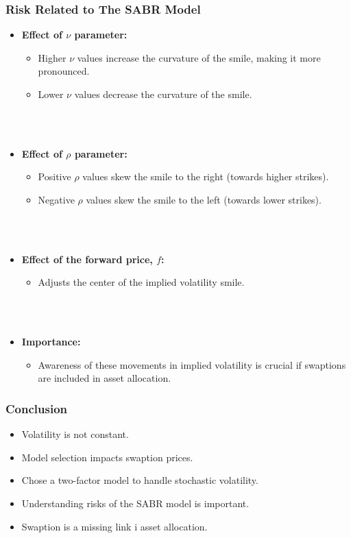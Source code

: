 \documentclass{beamer}
\begin{document}
\begin{frame}
    \frametitle{\textcolor{KUrod}{Risk Related to The SABR Model}}
    \begin{itemize}
    \\\\
        \item \textbf{Effect of $\nu$ parameter:}
        \begin{itemize}[label=\textcolor{KUrod}{\textbullet}]
            \item Higher $\nu$ values increase the curvature of the smile, making it more pronounced.
            \item Lower $\nu$ values decrease the curvature of the smile.
        \end{itemize}
    \\\\
        \item \textbf{Effect of $\rho$ parameter:}
        \begin{itemize}[label=\textcolor{KUrod}{\textbullet}]
            \item Positive $\rho$ values skew the smile to the right (towards higher strikes).
            \item Negative $\rho$ values skew the smile to the left (towards lower strikes).
        \end{itemize}
    \\\\
        \item \textbf{Effect of the forward price, $f$:}
        \begin{itemize}[label=\textcolor{KUrod}{\textbullet}]
            \item Adjusts the center of the implied volatility smile.
        \end{itemize}
    \\\\
        \item \textbf{Importance:}
        \begin{itemize}[label=\textcolor{KUrod}{\textbullet}]
            \item Awareness of these movements in implied volatility is crucial if swaptions are included in asset allocation.
        \end{itemize}
    \end{itemize} 
\end{frame}

\begin{frame}
    \frametitle{\textcolor{KUrod}{Conclusion}}
    \begin{itemize}[label=\textcolor{KUrod}{\textbullet}]
        \item Volatility is not constant.
        \item Model selection impacts swaption prices.
        \item Chose a two-factor model to handle stochastic volatility.
        \item Understanding risks of the SABR model is important.
        \item Swaption is a missing link i asset allocation.
    \end{itemize}
\end{frame}
\end{document}
